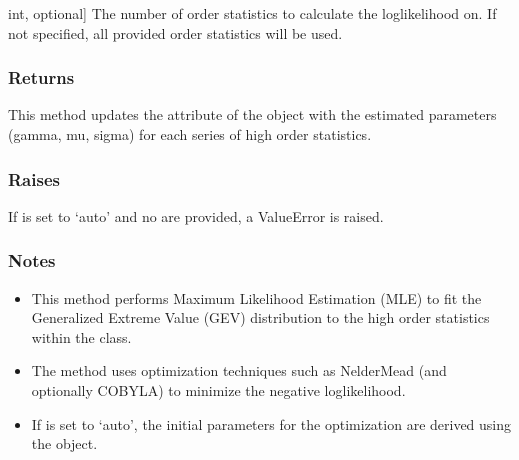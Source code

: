 \documentclass[a4paper,11pt,openany,english]{sphinxmanual}
\begin{document}
\begin{fulllineitems}
\begin{fulllineitems}
\begin{description}
\sphinxlineitem{r}{[}int, optional{]}
\sphinxAtStartPar
The number of order statistics to calculate the log\sphinxhyphen{}likelihood on. If not specified, all provided 
order statistics will be used.

\end{description}


\subsubsection{Returns}
\label{\detokenize{api_topt:id56}}\begin{description}
\sphinxAtStartPar
This method updates the  attribute of the  object with the estimated parameters 
(gamma, mu, sigma) for each series of high order statistics.

\end{description}


\subsubsection{Raises}
\label{\detokenize{api_topt:id57}}\begin{description}
\sphinxAtStartPar
If  is set to ‘auto’ and no  are provided, a ValueError is raised.

\end{description}


\subsubsection{Notes}
\label{\detokenize{api_topt:id58}}\begin{itemize}
\item {} 
\sphinxAtStartPar
This method performs Maximum Likelihood Estimation (MLE) to fit the Generalized Extreme Value (GEV) distribution to the high order statistics within the  class.

\item {} 
\sphinxAtStartPar
The method uses optimization techniques such as Nelder\sphinxhyphen{}Mead (and optionally COBYLA) to minimize the negative log\sphinxhyphen{}likelihood.

\item {} 
\sphinxAtStartPar
If  is set to ‘auto’, the initial parameters for the optimization are derived using the  object.


\end{itemize}
\end{fulllineitems}
\end{fulllineitems}
\end{document}
